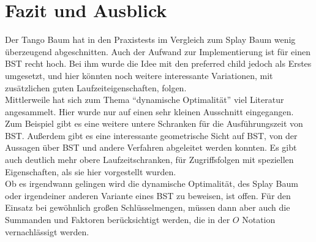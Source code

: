 \documentclass[a4paper,12pt]{article}
\begin{document}
\section{Fazit und Ausblick}
Der Tango Baum hat in den Praxistests im Vergleich zum Splay Baum wenig überzeugend abgeschnitten. Auch der Aufwand zur Implementierung ist für einen BST recht hoch. Bei ihm wurde die Idee mit den preferred child jedoch als Erstes umgesetzt, und hier könnten noch weitere interessante Variationen, mit zusätzlichen guten Laufzeiteigenschaften, folgen. \\
Mittlerweile hat sich zum Thema \enquote{dynamische Optimalität} viel Literatur angesammelt. Hier wurde nur auf einen sehr kleinen Ausschnitt eingegangen. Zum Beispiel gibt es eine weitere untere Schranken für die Ausführungszeit von BST. Außerdem gibt es eine interessante geometrische Sicht auf BST, von der Aussagen über BST und andere Verfahren abgeleitet werden konnten. 
Es gibt auch deutlich mehr obere Laufzeitschranken, für Zugriffsfolgen mit speziellen Eigenschaften, als sie hier vorgestellt wurden. \\
Ob es irgendwann gelingen wird die dynamische Optimalität, des Splay Baum oder irgendeiner anderen Variante eines BST zu beweisen, ist offen. Für den Einsatz bei gewöhnlich großen Schlüsselmengen, müssen dann aber auch die Summanden und Faktoren berücksichtigt werden, die in der $O$ Notation vernachlässigt werden.

 

 
\newpage


\end{document}
